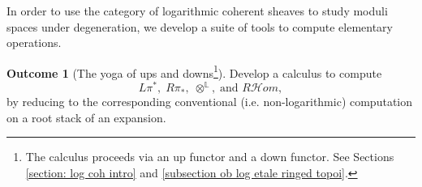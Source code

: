\documentclass[11pt]{amsart}
\theoremstyle{definition}
\theoremstyle{definition}
\newtheorem{outcome}{Outcome}
\begin{document}

In order to use the category of logarithmic coherent sheaves to study moduli spaces under degeneration, we develop a suite of tools to compute elementary operations.


\begin{outcome}[The yoga of ups and downs\footnote{The calculus proceeds via an up functor and a down functor. See Sections \ref{section: log coh intro} and \ref{subsection ob log etale ringed topoi}.}]\label{OutcomeI}
Develop a calculus to compute
    \[
        L\pi^\ast,\;R\pi_\ast,\;  \otimes^\mathbb{L}, \; \text{and } R\mathcal{H}om,
    \]
    by reducing to the corresponding conventional (i.e. non-logarithmic) computation on a root stack of an expansion. 
\end{outcome}
\end{document}
